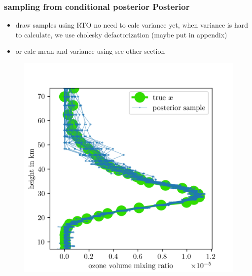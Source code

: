 \subsubsection{sampling from conditional posterior Posterior}
\begin{itemize}
	\item draw samples using RTO no need to calc variance yet, when variance is hard to calculate, we use cholesky defactorization (maybe put in appendix)
	\item or calc mean and variance using see other section
\end{itemize}
\begin{figure}[ht!]
	\centering
	\includegraphics{FirstTestRes.png}
	\caption[]{}
	\label{fig:O3Samp}
\end{figure}


